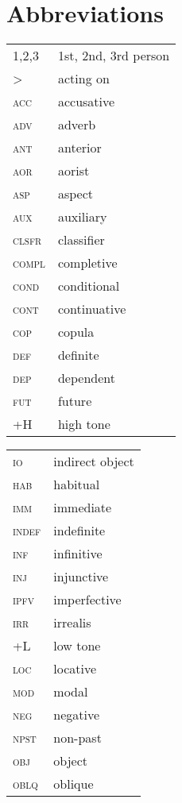 \documentclass[output=paper]{langsci/langscibook}
\begin{document}
\section*{Abbreviations}

 

\begin{tabularx}{.3\textwidth}{ll}
1,2,3 & 1st, 2nd, 3rd person\\
>  & acting on  \\
\textsc{acc}  & accusative\\  
\textsc{adv}   & adverb\\
\textsc{ant}   & anterior \\
\textsc{aor}   & aorist\\  
\textsc{asp}   & aspect\\
\textsc{aux}   & auxiliary  \\
\textsc{clsfr}   & classifier  \\
\textsc{compl}   & completive\\
\textsc{cond}   & conditional  \\
\textsc{cont}   & continuative  \\
\textsc{cop}   & copula\\
\textsc{def}   & definite\\  
\textsc{dep}   & dependent \\ 
\textsc{fut}   & future\\
\textsc{+H}   & high tone\\ 
\end{tabularx} 
\begin{tabularx}{.3\textwidth}{ll}
\textsc{io}  & indirect object  \\
\textsc{hab}   & habitual  \\
\textsc{imm}  & immediate\\
\textsc{indef}  & indefinite\\  
\textsc{inf}  & infinitive  \\
\textsc{inj}  & injunctive  \\
\textsc{ipfv}  & imperfective  \\
\textsc{irr}   & irrealis  \\
\textsc{+L}  & low tone  \\
\textsc{loc}  & locative  \\
\textsc{mod}  & modal  \\
\textsc{neg}  & negative  \\
\textsc{npst}  & non-past \\
\textsc{obj}  & object  \\
\textsc{oblq}  & oblique  \\
\end{tabularx} 
\end{document}
